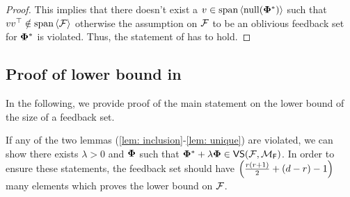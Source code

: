 \begin{proof}
    This implies that there doesn't exist a $v \in \text{span} \left<\mathrm{null}({\boldsymbol{\Phi}^*})\right>$ such that $vv^{\top} \notin \text{span} \left<{\mathcal{F}}\right>$ otherwise the assumption on ${\mathcal{F}}$ to be an oblivious feedback set for $\boldsymbol{\Phi}^*$ is violated. Thus, the statement of  has to hold.
\end{proof}



    \subsection{Proof of lower bound in }
    
    
    In the following, we provide proof of the main statement on the lower bound of the size of a feedback set.
    
    
    If any of the two lemmas (\ref{lem: inclusion}-\ref{lem: unique}) are violated, we can show there exists $\lambda > 0$ and $\boldsymbol{\Phi}$ such that $\boldsymbol{\Phi}^* + \lambda \boldsymbol{\Phi} \in \textsf{VS}({\mathcal{F}},{\mathcal{M}}_{\textsf{F}})$. In  order to ensure these statements, the feedback set should have $ \left( {\frac{r(r+1)}{2} + (d - r) - 1} \right) $ many elements which proves the lower bound on ${\mathcal{F}}$. 
    
